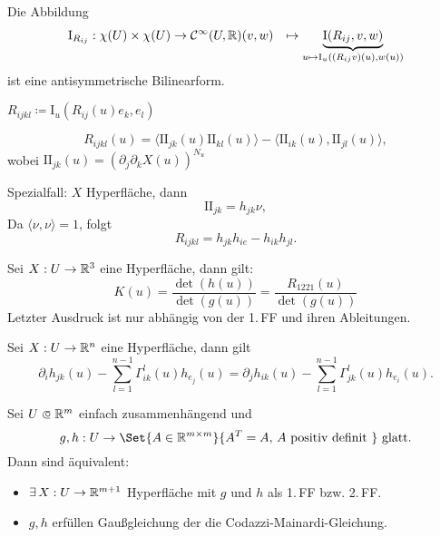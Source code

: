 \documentclass{cheat-sheet}
\newcommand{\I}{\mathrm{I}}
\newcommand{\II}{\mathrm{I\!I}}
\let\mySum\sum
\DeclareMathOperator*{\textsum}{{\textstyle \mySum}}
\renewcommand{\sum}{\textsum\limits}
\newcommand\opn{\mathrel{\ooalign{$\subset$\cr
  \hidewidth\raise.1ex\hbox{$\circ\mkern.5mu$}\cr}}}
\begin{document}
\begin{satz}
  Die Abbildung
  \begin{align*}
    \I_{R_{ij}} : \chi(U) \times \chi(U) &\to \mathcal{C}^\infty(U, \R)
    (v, w) &\mapsto \underbrace{\I(R_{ij}, v, w)}_{u \mapsto \I_u((R_{ij} v)(u), w(u))}
  \end{align*}
  ist eine antisymmetrische Bilinearform.
\end{satz}

\begin{nota}
  $R_{ijkl} \coloneqq \I_u(R_{ij}(u) e_k, e_l)$
\end{nota}

\begin{satz}[Gaußgleichung]
  \[ R_{ijkl}(u) = \langle \II_{jk} (u) \II_{kl}(u) \rangle - \langle \II_{ik}(u), \II_{jl}(u) \rangle, \]
  wobei $\II_{jk}(u) = \left( \partial_j \partial_k X(u) \right)^{N_u}$
\end{satz}

\begin{bem}
  Spezialfall: $X$ Hyperfläche, dann
  \[ \II_{jk} = h_{jk} \nu, \]
  Da $\langle \nu, \nu \rangle = 1$, folgt
  \[ R_{ijkl} = h_{jk} h_{ie} - h_{ik} h_{jl}. \]
\end{bem}

\begin{satz}
  Sei $X : U \to \mathbb{R}^3$ eine Hyperfläche, dann gilt:
  \[ K(u) = \frac{\det(h(u))}{\det(g(u))} = \frac{R_{1221}(u)}{\det(g(u))} \]
  Letzter Ausdruck ist nur abhängig von der 1.\,FF und ihren Ableitungen.
\end{satz}

\begin{satz}
  Sei $X : U \to \mathbb{R}^n$ eine Hyperfläche, dann gilt
  \[ \partial_i h_{jk}(u) - \sum_{l=1}^{n-1} \Gamma_{ik}^l(u) h_{e_j}(u) = \partial_j h_{ik}(u) - \sum_{l=1}^{n-1} \Gamma_{jk}^l(u) h_{e_i}(u). \]
\end{satz}

\begin{satz}
  Sei $U \opn \R^m$ einfach zusammenhängend und
  \[ g, h : U \to \Set{ A \in \R^{m \times m} }{ A^T = A, \, A \text{ positiv definit } } \text{ glatt}. \]
  Dann sind äquivalent:
  \begin{itemize}
    \item $\exists \, X : U \to \mathbb{R}^{m+1}$ Hyperfläche mit $g$ und $h$ als 1.\,FF bzw. 2.\,FF.
    \item $g, h$ erfüllen Gaußgleichung der die Codazzi-Mainardi-Gleichung.
  \end{itemize}
\end{satz}
\end{document}
